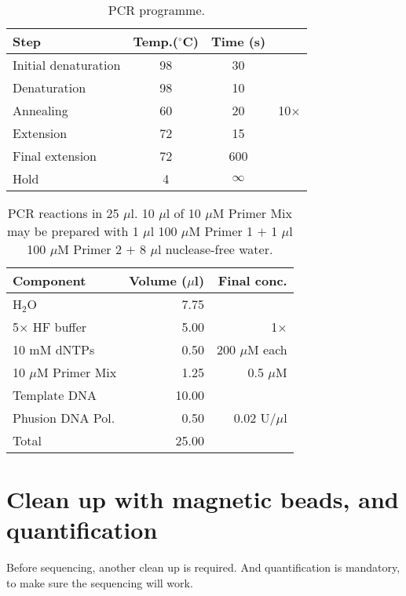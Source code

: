 \documentclass[a4paper,12pt]{article}
\begin{document}
\begin{table}
 \begin{center}
  \caption{PCR programme.}\label{tau:pcrprogramme}
  \vspace*{0.3cm}
  \begin{tabular}{lccl}
   \toprule
Step&Temp.($^\circ$C)&Time (s)&\\
   \midrule
Initial denaturation&98&30&\\
Denaturation&98&\multicolumn{1}{c|}{10}&\\
Annealing&60&\multicolumn{1}{c|}{20}&10$\times$\\
Extension&72&\multicolumn{1}{c|}{15}&\\
Final extension&72&600&\\
Hold&4&$\infty$&\\
   \bottomrule
  \end{tabular}
 \end{center}
\end{table}

\begin{table}
\begin{center}
\caption{PCR reactions in 25 $\mu$l. 10 $\mu$l of 10 $\mu$M Primer Mix may be prepared with 1 $\mu$l 100 $\mu$M Primer 1 $+$ 1 $\mu$l 100 $\mu$M Primer 2 $+$ 8 $\mu$l nuclease-free water.}\label{tau:PCR}
\vspace*{0.2cm}
\begin{tabular}{lrr}
\toprule
Component&Volume ($\mu$l)&Final conc.\\
\midrule
H$_2$O&7.75&\\
5$\times$ HF buffer&5.00&1$\times$\\
10 mM dNTPs&0.50&200 $\mu$M each\\
10 $\mu$M Primer Mix&1.25&0.5 $\mu$M\\
Template DNA&10.00&\\
Phusion DNA Pol.&0.50&0.02 U/$\mu$l\\
\midrule
Total&25.00&\\
\bottomrule
\end{tabular}
\end{center}
\end{table}


\section{Clean up with magnetic beads, and quantification}
Before sequencing, another clean up is required. And quantification is mandatory, to make sure the sequencing will work.



\end{document}
